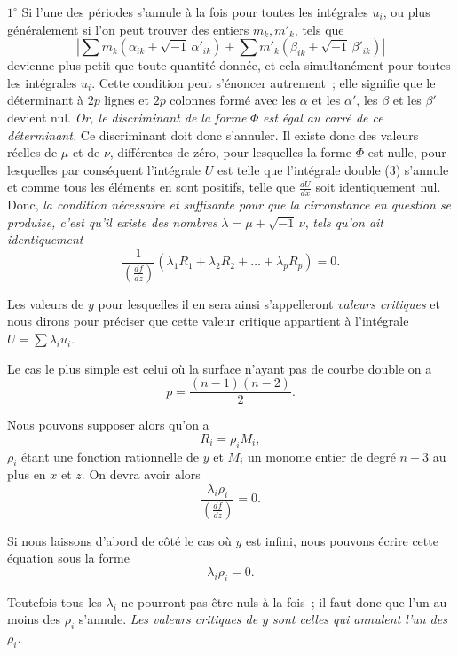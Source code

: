\documentclass{article}
\begin{document}
$1^\circ$ Si l'une des périodes s'annule à la fois pour toutes les intégrales $u_{i}$, ou plus généralement si l'on peut trouver des entiers $m_{k}, m'_{k}$, tels que
\[
\left| \sum m_{k} (\alpha_{ik} + \sqrt{-1}\,\alpha'_{ik}) + \sum m'_{k} (\beta_{ik} + \sqrt{-1}\,\beta'_{ik}) \right|
\]
devienne plus petit que toute quantité donnée, et cela simultanément pour toutes les intégrales $u_{i}$. Cette condition peut s'énoncer autrement~; elle signifie que le déterminant à $2p$ lignes et $2p$ colonnes formé avec les $\alpha$ et les $\alpha'$, les $\beta$ et les $\beta'$ devient nul. \emph{Or, le discriminant de la forme} $\Phi$ \emph{est égal au carré de ce déterminant.} Ce discriminant doit donc s'annuler. Il existe donc des valeurs réelles de $\mu$ et de $\nu$, différentes de zéro, pour lesquelles la forme $\Phi$ est nulle, pour lesquelles par conséquent l'intégrale $U$ est telle que l'intégrale double (3) s'annule et comme tous les éléments en sont positifs, telle que $\frac{dU}{dx}$ soit identiquement nul. Donc, \emph{la condition nécessaire et suffisante pour que la circonstance en question se produise, c'est qu'il existe des nombres} $\lambda = \mu + \sqrt{-1}\,\nu$, \emph{tels qu'on ait identiquement}
\[
\frac{1}{\left(\frac{df}{dz}\right)} (\lambda_{1} R_{1} + \lambda_{2} R_{2} + \ldots + \lambda_{p} R_{p}) = 0.
\]

Les valeurs de $y$ pour lesquelles il en sera ainsi s'appelleront \emph{valeurs critiques} et nous dirons pour préciser que cette valeur critique appartient à l'intégrale $U = \displaystyle\sum \lambda_{i} u_{i}$.

Le cas le plus simple est celui où la surface n'ayant pas de courbe double on a
\[
p = \frac{(n - 1)(n - 2)}{2}.
\]

Nous pouvons supposer alors qu'on a
\[
R_{i} = \rho_{i} M_{i},
\]
$\rho_{i}$ étant une fonction rationnelle de $y$ et $M_{i}$ un monome entier de degré
$n - 3$ au plus en $x$ et $z$. On devra avoir alors
\[
\frac{\lambda_{i} \rho_{i}}{\left(\frac{df}{dz}\right)} = 0.
\]

Si nous laissons d'abord de côté le cas où $y$ est infini, nous pouvons écrire cette équation sous la forme
\[
\lambda_{i} \rho_{i} = 0.
\]

Toutefois tous les $\lambda_{i}$ ne pourront pas être nuls à la fois~; il faut donc que l'un au moins des $\rho_{i}$ s'annule. \emph{Les valeurs critiques de $y$ sont celles qui annulent l'un des $\rho_{i}$.}
\end{document}
